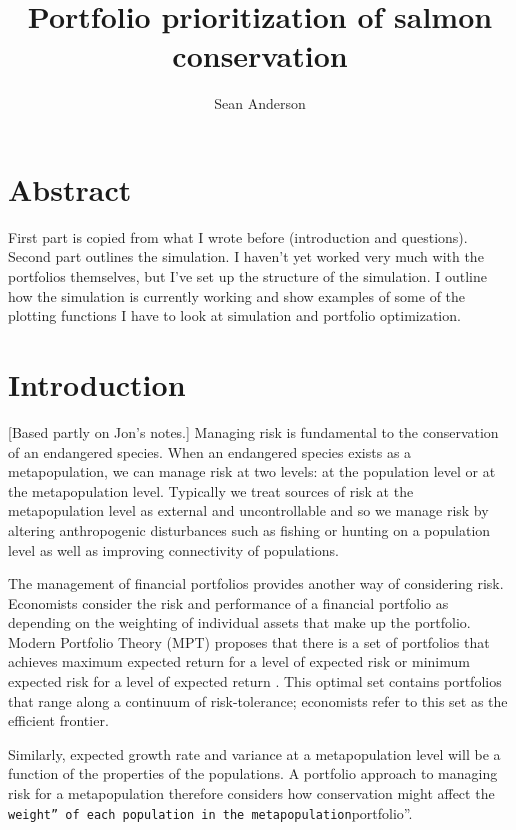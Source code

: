 \documentclass[12pt]{article}
\title{Portfolio prioritization of salmon conservation}
\author{Sean Anderson}
\date{}
\begin{document}
\maketitle

\section{Abstract}

First part is copied from what I wrote before (introduction and
questions). Second part outlines the simulation. I haven't yet worked
very much with the portfolios themselves, but I've set up the structure
of the simulation. I outline how the simulation is currently working and
show examples of some of the plotting functions I have to look at
simulation and portfolio optimization.

\section{Introduction}

{[}Based partly on Jon's notes.{]} Managing risk is fundamental to the
conservation of an endangered species. When an endangered species exists
as a metapopulation, we can manage risk at two levels: at the population
level or at the metapopulation level. Typically we treat sources of risk
at the metapopulation level as external and uncontrollable and so we
manage risk by altering anthropogenic disturbances such as fishing or
hunting on a population level as well as improving connectivity of
populations.

The management of financial portfolios provides another way of
considering risk. Economists consider the risk and performance of a
financial portfolio as depending on the weighting of individual assets
that make up the portfolio. Modern Portfolio Theory (MPT) proposes that
there is a set of portfolios that achieves maximum expected return for a
level of expected risk or minimum expected risk for a level of expected
return \citep{Markowitz1952, Markowitz1959}. This optimal set contains
portfolios that range along a continuum of risk-tolerance; economists
refer to this set as the efficient frontier.

Similarly, expected growth rate and variance at a metapopulation level
will be a function of the properties of the populations. A portfolio
approach to managing risk for a metapopulation therefore considers how
conservation might affect the
\texttt{weight'' of each population in the metapopulation}portfolio''.
\end{document}
